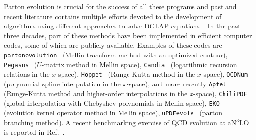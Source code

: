 \documentclass[12pt,notitlepage,aps,preprintnumbers,superscriptaddress,nofootinbib,aps,prd,floatfix]{revtex4-2}
\begin{document}
Parton evolution is crucial for the success of all these programs and past and recent literature contains multiple efforts devoted to the development of algorithms using different approaches to solve DGLAP equations~\cite{Furmanski:1981cw,Rossi:1983xz,DaLuzVieira:1990xk,Kumano:1992vd,Pascaud:1994vx,Miyama:1995bd,Pascaud:1996ci,Kosower:1997hg,Hirai:1997gb,Blumlein:1997em,Coriano:1998wj,Santorelli:1998yt,Ratcliffe:2000kp,Weinzierl:2002mv,Cafarella:2005zj,Jadach:2005bf,Guzzi:2006wx,Jadach:2007qa,Simonelli:2024vyh}. In the past three decades, part of these methods have been implemented in efficient computer codes, some of which are publicly available. Examples of these codes are \texttt{partonevolution}~\cite{Weinzierl:2002mv} (Mellin-transform method with an optimized contour), \texttt{Pegasus}~\cite{Vogt:2004ns} ($U$-matrix method in Mellin space), \texttt{Candia}~\cite{Cafarella:2008du,candiav1} (logarithmic recursion relations in the $x$-space), \texttt{Hoppet}~\cite{Salam:2008qg,Karlberg:2026kte} (Runge-Kutta method in the $x$-space), \texttt{QCDNum}~\cite{Botje:2010ay} (polynomial spline interpolation in the $x$-space), 
and more recently 
\texttt{Apfel}~\cite{Bertone:2013vaa,Bertone:2017gds} (Runge-Kutta method and higher-order interpolations in the $x$-space), \texttt{ChiliPDF}~\cite{Diehl:2021gvs} (global interpolation with Chebyshev polynomials in Mellin space),
\texttt{EKO}~\cite{Candido:2022tld} (evolution kernel operator method in Mellin space),
\texttt{uPDFevolv}~\cite{Hautmann:2014uua,Jung:2024uwc} (parton branching method). A recent benchmarking exercise of QCD evolution at aN$^3$LO is reported in Ref.~\cite{Cooper-Sarkar:2024crx}. 
\end{document}
